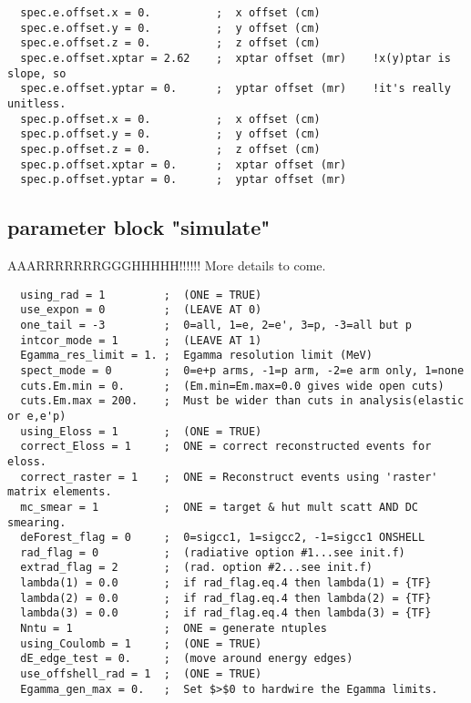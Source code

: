 \begin{verbatim}
  spec.e.offset.x = 0.          ;  x offset (cm)
  spec.e.offset.y = 0.          ;  y offset (cm)
  spec.e.offset.z = 0.          ;  z offset (cm)
  spec.e.offset.xptar = 2.62    ;  xptar offset (mr)    !x(y)ptar is slope, so
  spec.e.offset.yptar = 0.      ;  yptar offset (mr)    !it's really unitless.
  spec.p.offset.x = 0.          ;  x offset (cm)
  spec.p.offset.y = 0.          ;  y offset (cm)
  spec.p.offset.z = 0.          ;  z offset (cm)
  spec.p.offset.xptar = 0.      ;  xptar offset (mr)
  spec.p.offset.yptar = 0.      ;  yptar offset (mr)
\end{verbatim}


\subsection{parameter block "simulate"}

AAARRRRRRRGGGHHHHH!!!!!!  More details to come.

\begin{verbatim}
  using_rad = 1         ;  (ONE = TRUE)
  use_expon = 0         ;  (LEAVE AT 0)
  one_tail = -3         ;  0=all, 1=e, 2=e', 3=p, -3=all but p
  intcor_mode = 1       ;  (LEAVE AT 1)
  Egamma_res_limit = 1. ;  Egamma resolution limit (MeV)
  spect_mode = 0        ;  0=e+p arms, -1=p arm, -2=e arm only, 1=none
  cuts.Em.min = 0.      ;  (Em.min=Em.max=0.0 gives wide open cuts)
  cuts.Em.max = 200.    ;  Must be wider than cuts in analysis(elastic or e,e'p)
  using_Eloss = 1       ;  (ONE = TRUE)
  correct_Eloss = 1     ;  ONE = correct reconstructed events for eloss.
  correct_raster = 1    ;  ONE = Reconstruct events using 'raster' matrix elements.
  mc_smear = 1          ;  ONE = target & hut mult scatt AND DC smearing.
  deForest_flag = 0     ;  0=sigcc1, 1=sigcc2, -1=sigcc1 ONSHELL
  rad_flag = 0          ;  (radiative option #1...see init.f)
  extrad_flag = 2       ;  (rad. option #2...see init.f)
  lambda(1) = 0.0       ;  if rad_flag.eq.4 then lambda(1) = {TF}
  lambda(2) = 0.0       ;  if rad_flag.eq.4 then lambda(2) = {TF}
  lambda(3) = 0.0       ;  if rad_flag.eq.4 then lambda(3) = {TF}
  Nntu = 1              ;  ONE = generate ntuples
  using_Coulomb = 1     ;  (ONE = TRUE)
  dE_edge_test = 0.     ;  (move around energy edges)
  use_offshell_rad = 1  ;  (ONE = TRUE)
  Egamma_gen_max = 0.   ;  Set $>$0 to hardwire the Egamma limits.
\end{verbatim}



